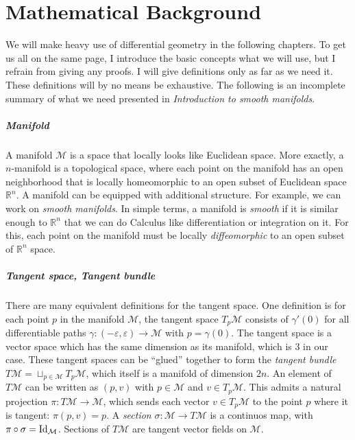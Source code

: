\documentclass[../thesis.tex]{subfiles}
\begin{document}
\chapter{Mathematical Background}\label{ch:math-background}
We will make heavy use of differential geometry in the following chapters.
To get us all on the same page, I introduce the basic concepts what we will use, but I refrain from
giving any proofs. I will give definitions only as far as we need it. These definitions
will by no means be exhaustive. The following is an incomplete summary of what we need presented in
\emph{Introduction to smooth manifolds}\cite{Lee00}.

\paragraph{Manifold} A manifold $\mathcal{M}$ is a space that locally looks like Euclidean space.
More exactly, a $n$-manifold is a topological space, where each point on the manifold has an open neighborhood
that is locally homeomorphic to an open subset of Euclidean space $\mathbb{R}^n$.
A manifold can be equipped with additional structure. For example, we can work on \emph{smooth manifolds}.
In simple terms, a manifold is \emph{smooth} if it is similar enough to $\mathbb{R}^n$ that we can do Calculus
like differentiation or integration on it. For this, each point on the manifold must be
locally \emph{diffeomorphic} to an open subset of $\mathbb{R}^n$ space.

\paragraph{Tangent space, Tangent bundle} There are many equivalent definitions
for the tangent space. One definition is for each point $p$ in the manifold $\mathcal{M}$,
the tangent space $T_p\mathcal{M}$ consists of $\gamma'(0)$ for all differentiable paths $\gamma: (-\varepsilon, \varepsilon) \to \mathcal{M}$
with $p = \gamma(0)$. The tangent space is a vector space which has the same dimension as its manifold,
which is 3 in our case. These tangent spaces can be ``glued'' together to form the
\emph{tangent bundle} $T\mathcal{M} = \sqcup _{p \in \mathcal{M}}T_p\mathcal{M}$, which itself
is a manifold of dimension $2n$. An element of $T\mathcal{M}$ can be written
as $(p,v)$ with $p \in \mathcal{M}$ and $v \in T_p\mathcal{M}$. This admits a natural projection $\pi : T\mathcal{M} \to \mathcal{M}$,
which sends each vector $v \in T_p\mathcal{M}$ to the point $p$ where it is tangent: $\pi(p,v)=p$.
A \emph{section} $\sigma: \mathcal{M} \to T\mathcal{M}$ is a continuos map, with $\pi \circ \sigma = \operatorname{Id}_{\mathcal{M}}$.
Sections of $T\mathcal{M}$ are tangent vector fields on $\mathcal{M}$.
\end{document}
